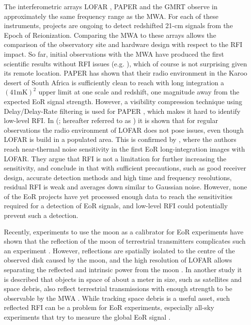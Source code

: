 \documentclass{pasa}
\begin{document}
The interferometric arrays LOFAR \citep{lofar-2013}, PAPER \citep{parsons-paper-eorlimit-2014} and the GMRT \citep{the-gmrt-swarup-chapter-2013} observe in approximately the same frequency range as the MWA. For each of these instruments, projects are ongoing to detect redshifted 21-cm signals from the Epoch of Reionization. Comparing the MWA to these arrays allows the comparison of the observatory site and hardware design with respect to the RFI impact. So far, initial observations with the MWA have produced the first scientific results without RFI issues (e.g. \citealt{mwacs-2014}), which of course is not surprising given its remote location. PAPER has shown that their radio environment in the Karoo desert of South Africa is sufficiently clean to reach with long integration a $(41 \textrm{mK})^2$ upper limit at one scale and redshift, one magnitude away from the expected EoR signal strength. However, a visibility compression technique using Delay/Delay-Rate filtering is used for PAPER \citep{parsons-paper-eorlimit-2014}, which makes it hard to identify low-level RFI. In \citeauthor{lofar-radio-environment} (\citeyear{lofar-radio-environment}; hereafter referred to as ) it is shown that for regular observations the radio environment of LOFAR does not pose issues, even though LOFAR is build in a populated area. This is confirmed by \citet{ncp-eor-yatawatta}, where the authors reach near-thermal noise sensitivity in the first EoR long-integration images with LOFAR. They argue that RFI is not a limitation for further increasing the sensitivity, and conclude in \citet{offringa-rfi-distributions} that with sufficient precautions, such as good receiver design, accurate detection methods and high time and frequency resolutions, residual RFI is weak and averages down similar to Gaussian noise. However, none of the EoR projects have yet processed enough data to reach the sensitivities required for a detection of EoR signals, and low-level RFI could potentially prevent such a detection.

Recently, experiments to use the moon as a calibrator for EoR experiments have shown that the reflection of the moon of terrestrial transmitters complicates such an experiment \citep{mckinley-moon-2013}. However, reflections are spatially isolated to the centre of the observed disk caused by the moon, and the high resolution of LOFAR allows separating the reflected and intrinsic power from the moon \citep{vedantham-2014-todo}. In another study it is described that objects in space of about a meter in size, such as satellites and space debris, also reflect terrestrial transmissions with enough strength to be observable by the MWA \citep{tingay-space-debris-2013}. While tracking space debris is a useful asset, such reflected RFI can be a problem for EoR experiments, especially all-sky experiments that try to measure the global EoR signal \citep{vedantham-2014-todo}.
\end{document}

